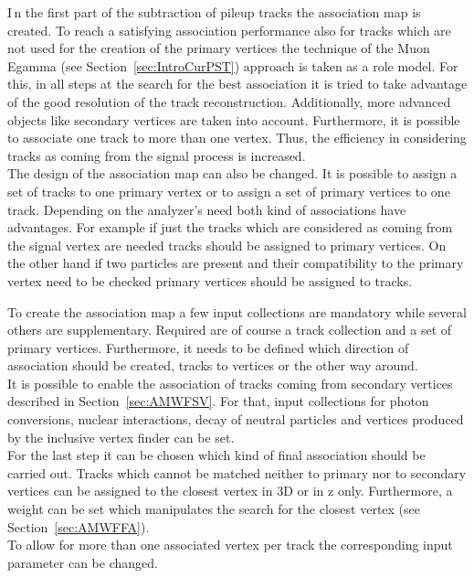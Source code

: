 
\lettrine[lines=2]{I}{\,}n the first part of the subtraction of pileup tracks the association map is created. To reach a satisfying association performance also for tracks which are not used for the creation of the primary vertices the technique of the Muon Egamma (see Section~\ref{sec:IntroCurPST}) approach is taken as a role model. For this, in all steps at the search for the best association it is tried to take advantage of the good resolution of the track reconstruction. Additionally, more advanced objects like secondary vertices are taken into account. Furthermore, it is possible to associate one track to more than one vertex. Thus, the efficiency in considering tracks as coming from the signal process is increased. \\
The design of the association map can also be changed. It is possible to assign a set of tracks to one primary vertex or to assign a set of primary vertices to one track. Depending on the analyzer's need both kind of associations have advantages. For example if just the tracks which are considered as coming from the signal vertex are needed tracks should be assigned to primary vertices. On the other hand if two particles are present and their compatibility to the primary vertex need to be checked primary vertices should be assigned to tracks.


To create the association map a few input collections are mandatory while several others are supplementary. Required are of course a track collection and a set of primary vertices. Furthermore, it needs to be defined which direction of association should be created, tracks to vertices or the other way around. \\ 
It is possible  to enable the association of tracks coming from secondary vertices described in Section~\ref{sec:AMWFSV}. For that, input collections for photon conversions, nuclear interactions, decay of neutral particles and vertices produced by the inclusive vertex finder can be set. \\
For the last step it can be chosen which kind of final association should be carried out. Tracks which cannot be matched neither to primary nor to secondary vertices can be assigned to the closest vertex in 3D or in z only. Furthermore, a weight can be set which manipulates the search for the closest vertex (see Section~\ref{sec:AMWFFA}). \\
To allow for more than one associated vertex per track the corresponding input parameter can be changed.

